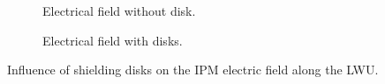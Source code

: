 \begin{figure}[!ht]
	\centering
	\begin{subfigure}{0.7\textwidth}
		
		\caption[]{Electrical field without disk.}
		\label{chap3:no_disk}
	\end{subfigure}

	\begin{subfigure}{0.7\textwidth}
		\centering
		
		\caption{Electrical field with disks.}
		\label{chap3:disks}
	\end{subfigure}
	\caption[Influence of shielding disks on the IPM electric field]{Influence of shielding disks on the IPM electric field along the LWU.}
	\label{chap3:IPM_disk}
\end{figure}
